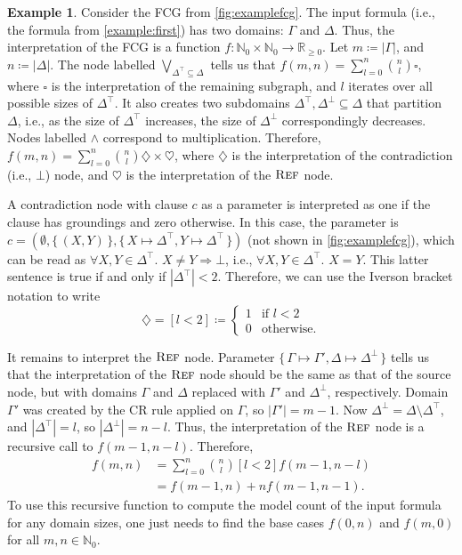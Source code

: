 \documentclass{article}
\theoremstyle{definition}
\newtheorem{example}{Example}
\DeclareMathOperator{\Reff}{\textsc{Ref}}
\begin{document}
\begin{example}\label{example:interpretation}
  Consider the FCG from \cref{fig:examplefcg}. The input formula (i.e., the
  formula from \cref{example:first}) has two domains: $\Gamma$ and $\Delta$.
  Thus, the interpretation of the FCG is a function
  $f\colon \mathbb{N}_{0} \times \mathbb{N}_{0} \to \mathbb{R}_{\ge 0}$. Let
  $m \coloneqq |\Gamma|$, and $n \coloneqq |\Delta|$. The node labelled
  $\bigvee_{\Delta^{\top} \subseteq \Delta}$ tells us that
  $f(m, n) = \sum_{l = 0}^{n} \binom{n}{l} \square$, where $\square$ is the
  interpretation of the remaining subgraph, and $l$ iterates over all possible
  sizes of $\Delta^{\top}$. It also creates two subdomains
  $\Delta^{\top}, \Delta^{\bot} \subseteq \Delta$ that partition $\Delta$, i.e.,
  as the size of $\Delta^{\top}$ increases, the size of $\Delta^{\bot}$
  correspondingly decreases. Nodes labelled $\land$ correspond to
  multiplication. Therefore,
  $f(m, n) = \sum_{l = 0}^{n} \binom{n}{l} \diamondsuit \times \heartsuit$,
  where $\diamondsuit$ is the interpretation of the contradiction (i.e., $\bot$)
  node, and $\heartsuit$ is the interpretation of the $\Reff$ node.

  A contradiction node with clause $c$ as a parameter is interpreted as one if
  the clause has groundings and zero otherwise. In this case, the parameter is
  $c = (\emptyset, \{\, (X, Y) \,\}, \{\, X \mapsto \Delta^\top, Y \mapsto \Delta^\top \,\})$
  (not shown in \cref{fig:examplefcg}), which can be read as
  $\forall X, Y \in \Delta^{\top}\text{. }X \ne Y \Rightarrow \bot$, i.e.,
  $\forall X, Y \in \Delta^{\top}\text{. }X = Y$. This latter sentence is true
  if and only if $|\Delta^{\top}| < 2$. Therefore, we can use the Iverson
  bracket notation to write
  \[
    \diamondsuit = [l < 2] \coloneqq
    \begin{cases}
      1 & \text{if } l < 2 \\
      0 & \text{otherwise.}
    \end{cases}
  \]

  It remains to interpret the $\Reff$ node. Parameter
  $\{\, \Gamma \mapsto \Gamma', \Delta \mapsto \Delta^\bot \,\}$ tells us that
  the interpretation of the $\Reff$ node should be the same as that of the
  source node, but with domains $\Gamma$ and $\Delta$ replaced with $\Gamma'$
  and $\Delta^{\bot}$, respectively. Domain $\Gamma'$ was created by the CR rule
  applied on $\Gamma$, so $|\Gamma'| = m - 1$. Now
  $\Delta^{\bot} = \Delta \setminus \Delta^{\top}$, and $|\Delta^{\top}| = l$,
  so $|\Delta^{\bot}| = n - l$. Thus, the interpretation of the $\Reff$ node is
  a recursive call to $f(m - 1, n - l)$. Therefore,
  \begin{align}
    f(m, n) &= \sum_{l = 0}^{n} \binom{n}{l} [l < 2] f(m-1, n-l)\nonumber \\
            &= f(m-1, n) + n f(m-1, n-1).\label{eq:solution}
  \end{align}
  To use this recursive function to compute the model count of the input formula
  for any domain sizes, one just needs to find the base cases $f(0, n)$ and
  $f(m, 0)$ for all $m, n \in \mathbb{N}_{0}$.
\end{example}
\end{document}
